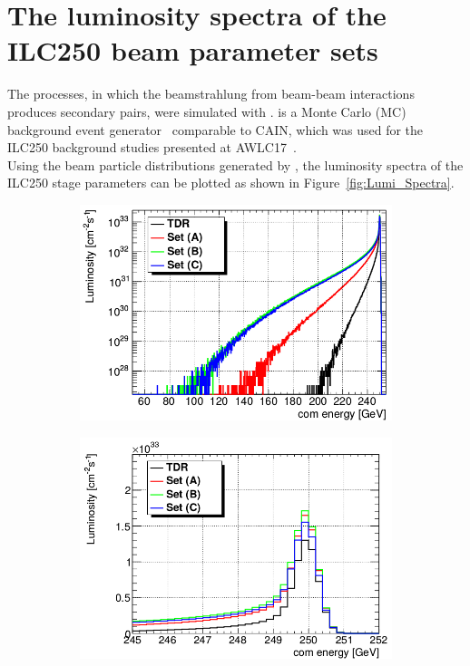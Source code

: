 \newpage
\section{The luminosity spectra of the ILC250 beam parameter sets}
\label{sec:Envelopes}
The processes, in which the beamstrahlung from beam-beam interactions produces secondary \Pep \Pem pairs, were simulated with \guineapig.
\guineapig is a Monte Carlo (MC) background event generator~\cite{Schulte:1997nga} comparable to CAIN, which was used for the ILC250 background studies presented at AWLC17~\cite{AWLC_Jeans}.\\
Using the beam particle distributions generated by \guineapig, the luminosity spectra of the ILC250 stage parameters can be plotted as shown in Figure~\ref{fig:Lumi_Spectra}.
\begin{figure}[h]
\centering
\begin{subfigure}[t]{0.49\textwidth}
\centering
\includegraphics[width=\textwidth]{figures/Lumi_Spectrum.png}
\caption{}
\end{subfigure}
\hspace*{0.08cm}
\begin{subfigure}[t]{0.49\textwidth}
\centering
\includegraphics[width=1.02\textwidth]{figures/Lumi_Spectrum_zoom.png}

\end{subfigure}
\end{figure}
